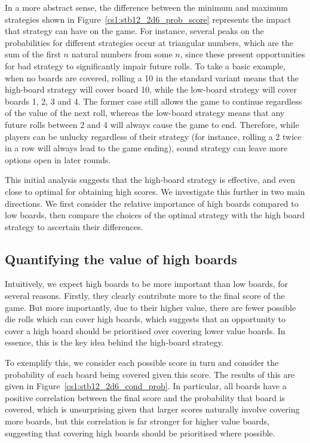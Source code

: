 In a more abstract sense, the difference between the minimum and maximum strategies shown in  Figure~\ref{cs1:stb12_2d6_prob_score} represents the impact that strategy can have on the game. For instance, several peaks on the probabilities for different strategies occur at triangular numbers, which are the sum of the first $n$ natural numbers from some $n$, since these present opportunities for bad strategy to significantly impair future rolls. To take a basic example, when no boards are covered, rolling a 10 in the standard variant means that the high-board strategy will cover board 10, while the low-board strategy will cover boards 1, 2, 3 and 4. The former case still allows the game to continue regardless of the value of the next roll, whereas the low-board strategy means that any future rolls between 2 and 4 will always cause the game to end. Therefore, while players can be unlucky regardless of their strategy (for instance, rolling a 2 twice in a row will always lead to the game ending), sound strategy can leave more options open in later rounds.

This initial analysis suggests that the high-board strategy is effective, and even close to optimal for obtaining high scores. We investigate this further in two main directions. We first consider the relative importance of high boards compared to low boards, then compare the choices of the optimal strategy with the high board strategy to ascertain their differences.

\subsection{Quantifying the value of high boards}

Intuitively, we expect high boards to be more important than low boards, for several reasons. Firstly, they clearly contribute more to the final score of the game. But more importantly, due to their higher value, there are fewer possible die rolls which can cover high boards, which suggests that an opportunity to cover a high board should be prioritised over covering lower value boards. In essence, this is the key idea behind the high-board strategy. 

To exemplify this, we consider each possible score in turn and consider the probability of each board being covered given this score. The results of this are given in Figure~\ref{cs1:stb12_2d6_cond_prob}. In particular, all boards have a positive correlation between the final score and the probability that board is covered, which is unsurprising given that larger scores naturally involve covering more boards, but this correlation is far stronger for higher value boards, suggesting that covering high boards should be prioritised where possible.

